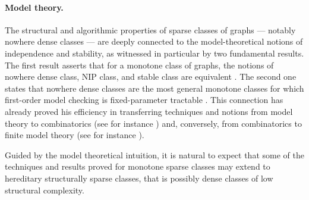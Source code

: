 \paragraph*{Model theory.}
The  structural and algorithmic properties of sparse classes of graphs --- notably nowhere dense classes --- are deeply connected to  the model-theoretical notions of independence and stability, as witnessed in particular by two fundamental results. The first result asserts that for a monotone class of graphs, the notions of nowhere dense class, NIP class, and stable class are equivalent \cite{adler2014interpreting}. The second one states that nowhere dense classes are the most general monotone classes for which first-order model checking is fixed-parameter tractable \cite{grohe2017deciding}. This connection has already proved his efficiency in transferring techniques and notions from model theory to combinatorics (see for instance \cite{pilipczuk2018number}) and, conversely, from combinatorics to finite model theory (see for instance \cite{rossman2008homomorphism}).

Guided by the model theoretical intuition, it is natural to expect that some of the techniques and results proved for monotone sparse classes may extend to hereditary structurally sparse classes, that is possibly dense classes of low structural complexity.